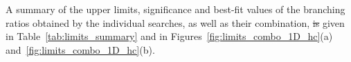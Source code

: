 \documentclass[PAPER, coverpage, atlasdraft=true, texlive=2016, UKenglish]{\ATLASLATEXPATH atlasdoc}
\providecommand{\DIFadd}[1]{{\protect\color{blue}\uwave{#1}}} %
\providecommand{\DIFdel}[1]{{\protect\color{red}\sout{#1}}}                      %
\providecommand{\DIFaddbegin}{} %
\providecommand{\DIFaddend}{} %
\providecommand{\DIFdelbegin}{} %
\providecommand{\DIFdelend}{} %
\begin{document}
A summary of the upper limits, significance and best-fit values of the branching ratios obtained by the individual searches, as well as their combination, \DIFdelbegin \DIFdel{is }\DIFdelend \DIFaddbegin \DIFadd{are }\DIFaddend given  
in Table~\ref{tab:limits_summary} and in Figures~\ref{fig:limits_combo_1D_hc}(a) and~\ref{fig:limits_combo_1D_hc}(b).
\end{document}
